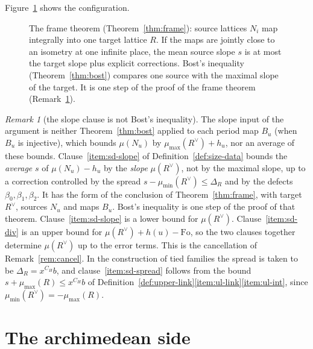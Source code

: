 \documentclass[11pt]{amsbook}
\theoremstyle{plain}
\theoremstyle{definition}
\theoremstyle{remark}
\newtheorem{remark}[theorem]{Remark}
\numberwithin{equation}{section}
\numberwithin{figure}{chapter}
\numberwithin{table}{chapter}
\newcommand{\Fo}{\mathrm{Fo}}
\begin{document}
\noindent Figure~\ref{fig:frame} shows the configuration.

\begin{figure}[htbp]
\centering

\caption{The frame theorem (Theorem~\ref{thm:frame}): source lattices $N_i$
map integrally into one target lattice $R$. If the maps are jointly
close to an isometry at one infinite place, the mean source slope $s$
is at most the target slope plus explicit corrections. Bost's
inequality (Theorem~\ref{thm:bost}) compares one source with the
maximal slope of the target. It is one step of the proof of the frame
theorem (Remark~\ref{rem:not-bost}).}
\label{fig:frame}
\end{figure}

\begin{remark}[the slope clause is not Bost's inequality]
\label{rem:not-bost}
The slope input of the argument is neither Theorem~\ref{thm:bost}
applied to each period map $B_u$ (when $B_u$ is injective), which
bounds $\mu(N_u)$ by $\mu_{\max}(R^\vee)+h_u$, nor an average of these
bounds. Clause~\ref{item:sd-slope} of
Definition~\ref{def:size-data} bounds the \emph{average} $s$ of
$\mu(N_u)-h_u$ by the \emph{slope} $\mu(R^\vee)$, not by the maximal
slope, up to a correction controlled by the spread
$s-\mu_{\min}(R^\vee)\le\Delta_R$ and by the defects
$\beta_0,\beta_1,\beta_2$. It has the form of the conclusion of
Theorem~\ref{thm:frame}, with target $R^\vee$, sources $N_u$ and maps
$B_u$. Bost's inequality is one step of the proof of that theorem.
Clause~\ref{item:sd-slope} is a lower bound for $\mu(R^\vee)$.
Clause~\ref{item:sd-div} is an
upper bound for $\mu(R^\vee)+h(u)-\Fo$, so the two clauses together
determine $\mu(R^\vee)$ up to the error terms. This is the cancellation
of Remark~\ref{rem:cancel}. In the construction of tied families the
spread is taken to be $\Delta_R=x^{C_H}b$, and clause~\ref{item:sd-spread}
follows from
the bound $s+\mu_{\max}(R)\le x^{C_H}b$ of
Definition~\ref{def:upper-link}\ref{item:ul-link}\ref{item:ul-int}, since
$\mu_{\min}(R^\vee)=-\mu_{\max}(R)$.
\end{remark}

\section{The archimedean side}
\end{document}
